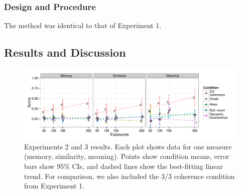 \documentclass[man,floatsintext]{apa6}
\begin{document}
\subsubsection{Design and Procedure} The method was identical to that
of Experiment 1.

\subsection{Results and Discussion}

\begin{figure}[t]
  \begin{center}
    \includegraphics[width=1.0\linewidth]{x23.pdf}
    \caption{Experiments 2 and 3 results. Each plot shows data for one
      measure (memory, similarity, meaning). Points show condition
      means, error bars show 95\% CIs, and dashed lines show the
      best-fitting linear trend. For comparison, we also included the
      3/3 coherence condition from Experiment 1.}
    \label{expt23-results}
  \end{center}
\end{figure}
\end{document}
